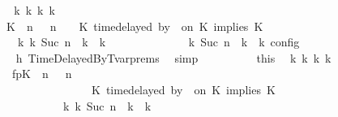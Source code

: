 \begin{isabellebody}
\ \ \ \ \ \ \ \ \isamarkupfalse%
\ \isamarkupfalse%
\ {\isacartoucheopen}{\isasymexists}{\isasymGamma}\isactrlsub k\ {\isasymPsi}\isactrlsub k\ {\isasymPhi}\isactrlsub k\ k{\isachardot}\isanewline
\ \ \ \ \ \ \ \ \ \ {\isacharparenleft}{\isacharparenleft}{\isacharparenleft}{\isacharparenleft}K\ {\isasymnot}{\isasymUp}\ n{\isacharparenright}\ {\isacharhash}\ {\isasymGamma}{\isacharparenright}{\isacharcomma}\ n\ {\isasymturnstile}\ {\isasymPsi}\ {\isasymtriangleright}\ {\isacharparenleft}{\isacharparenleft}K\ time{\isacharminus}delayed{\isasymsharp}\ by\ {\isasymdelta}{\isasymtau}\ on\ K\ implies\ K\ {\isacharhash}\ {\isasymPhi}{\isacharparenright}{\isacharparenright}\isanewline
\ \ \ \ \ \ \ \ \ \ \ \ {\isasymhookrightarrow}\isactrlbsup k\isactrlesup \ {\isacharparenleft}{\isasymGamma}\isactrlsub k{\isacharcomma}\ Suc\ n\ {\isasymturnstile}\ {\isasymPsi}\isactrlsub k\ {\isasymtriangleright}\ {\isasymPhi}\isactrlsub k{\isacharparenright}{\isacharparenright}\isanewline
\ \ \ \ \ \ \ \ \ \ {\isasymand}\ {\isasymrho}\ {\isasymin}\ {\isasymlbrakk}\ {\isasymGamma}\isactrlsub k{\isacharcomma}\ Suc\ n\ {\isasymturnstile}\ {\isasymPsi}\isactrlsub k\ {\isasymtriangleright}\ {\isasymPhi}\isactrlsub k\ {\isasymrbrakk}\isactrlsub c\isactrlsub o\isactrlsub n\isactrlsub f\isactrlsub i\isactrlsub g{\isacartoucheclose}\isanewline
\ \ \ \ \ \ \ \ \ \ \isamarkupfalse%
\ h{}\ TimeDelayedByTvar{\isachardot}prems\ \isamarkupfalse%
\ simp\isanewline
\ \ \ \ \ \ \ \ \isamarkupfalse%
\ this\ \isamarkupfalse%
\ {\isasymGamma}\isactrlsub k\ {\isasymPsi}\isactrlsub k\ {\isasymPhi}\isactrlsub k\ k\isanewline
\ \ \ \ \ \ \ \ \ \ \ fp{\isacharcolon}{\isacartoucheopen}{\isacharparenleft}{\isacharparenleft}{\isacharparenleft}K\ {\isasymnot}{\isasymUp}\ n{\isacharparenright}\ {\isacharhash}\ {\isasymGamma}{\isacharparenright}{\isacharcomma}\ n\isanewline
\ \ \ \ \ \ \ \ \ \ \ \ \ \ \ \ \ \ \ \ \ \ {\isasymturnstile}\ {\isasymPsi}\ {\isasymtriangleright}\ {\isacharparenleft}{\isacharparenleft}K\ time{\isacharminus}delayed{\isasymsharp}\ by\ {\isasymdelta}{\isasymtau}\ on\ K\ implies\ K\ {\isacharhash}\ {\isasymPhi}{\isacharparenright}{\isacharparenright}\isanewline
\ \ \ \ \ \ \ \ \ \ \ \ \ \ \ \ \ \ \ \ {\isasymhookrightarrow}\isactrlbsup k\isactrlesup \ {\isacharparenleft}{\isasymGamma}\isactrlsub k{\isacharcomma}\ Suc\ n\ {\isasymturnstile}\ {\isasymPsi}\isactrlsub k\ {\isasymtriangleright}\ {\isasymPhi}\isactrlsub k{\isacharparenright}{\isacartoucheclose}\isanewline

\end{isabellebody}
